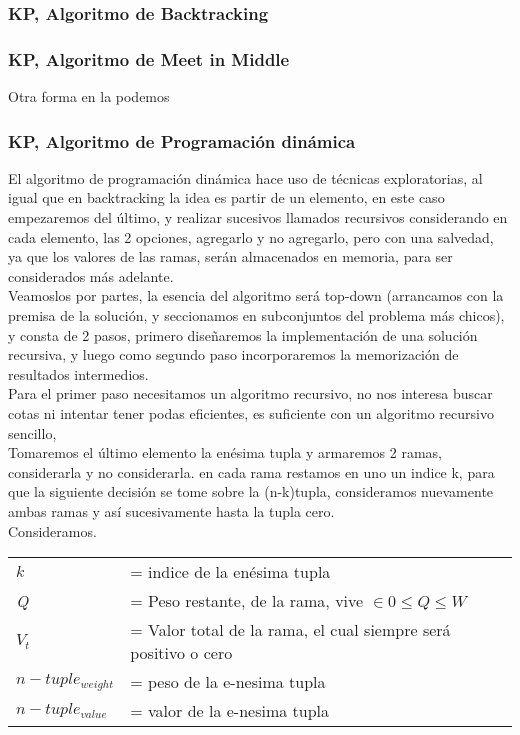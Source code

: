 \documentclass[fleqn, 11pt]{article}
\begin{document}
\subsubsection{\textbf{KP, Algoritmo de Backtracking}}

\clearpage

\subsubsection{\textbf{KP, Algoritmo de Meet in Middle}}

Otra forma en la podemos

\clearpage


\subsubsection{\textbf{KP, Algoritmo de Programación dinámica}}

El algoritmo de programación dinámica hace uso de técnicas exploratorias, al igual que en backtracking la idea es
partir de un elemento, en este caso empezaremos del último, y realizar sucesivos llamados recursivos considerando
en cada elemento, las 2 opciones, agregarlo y no agregarlo, pero con una salvedad, ya que los valores de las ramas,
serán almacenados en memoria, para ser considerados más adelante. \\

Veamoslos por partes, la esencia del algoritmo será top-down (arrancamos con la premisa de la solución, y seccionamos
en subconjuntos del problema más chicos), y consta de 2 pasos, primero diseñaremos la implementación de una solución
recursiva, y luego como segundo paso incorporaremos la memorización de resultados intermedios.  \\

Para el primer paso necesitamos un algoritmo recursivo, no nos interesa buscar cotas ni intentar tener podas eficientes,
es suficiente con un algoritmo recursivo sencillo,  \\

Tomaremos el último elemento la enésima tupla y armaremos 2 ramas, considerarla y no considerarla. en cada rama restamos
en uno un indice k, para que la siguiente decisión se tome sobre la (n-k)tupla, consideramos nuevamente ambas ramas y
así sucesivamente hasta la tupla cero.\\

Consideramos.\\
\begin{tabular}{l l}
    \textit{$k$} & = indice de la enésima tupla  \\
    \textit{Q} & = Peso restante, de la rama, vive $ \in 0 \leq \textit{Q} \leq W $  \\
    \textit{$V_t$} & = Valor total de la rama, el cual siempre será positivo o cero  \\
    \textit{$n-tuple_{weight}$} & = peso de la e-nesima tupla  \\
    \textit{$n-tuple_{value}$} & = valor de la e-nesima tupla  \\

\end{tabular}
\end{document}
